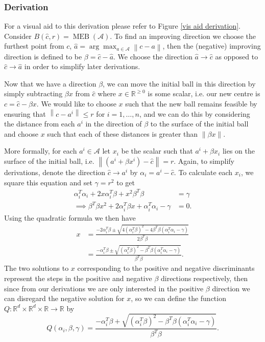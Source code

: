 \documentclass[11pt,twoside]{report}
\newcommand{\A}{\mathcal{A}} %
\newcommand{\norm}[1]{\left\lVert#1\right\rVert} %
\DeclareMathOperator{\MEB}{MEB}
\theoremstyle{definition}
\numberwithin{theorem}{section}
\numberwithin{definition}{section}
\numberwithin{lemma}{section}
\numberwithin{proposition}{section}
\numberwithin{equation}{section}
\numberwithin{figure}{section}
\begin{document}
\subsubsection{Derivation}
For a visual aid to this derivation please refer to Figure \ref{vis aid derivation}. Consider $B(\hat{c}, r) = \MEB(\A)$. To find an improving direction we choose the furthest point from $c$, $\hat{a}=\arg\max_{a\in\A}\norm{c-a}$, then the (negative) improving direction is defined to be $\beta=\hat{c}-\hat{a}$. We choose the direction $\hat{a}\to\hat{c}$ as opposed to $\hat{c}\to\hat{a}$ in order to simplify later derivations.

Now that we have a direction $\beta$, we can move the initial ball in this direction by simply subtracting $\beta x$ from $\hat{c}$ where $x\in\mathbb{R}^{\geq0}$ is some scalar, i.e. our new centre is $c=\hat{c}-\beta x$. We would like to choose $x$ such that the new ball remains feasible by ensuring that $\norm{c-a^i}\leq r$ for $i=1,\ldots,n$, and we can do this by considering the distance from each $a^i$ in the direction of $\beta$ to the surface of the initial ball and choose $x$ such that each of these distances is greater than $\norm{\beta x}$.

More formally, for each $a^i\in\A$ let $x_i$ be the scalar such that $a^i+\beta x_i$ lies on the surface of the initial ball, i.e. $\norm{(a^i+\beta x^i)-\hat{c}}=r$. Again, to simplify derivations, denote the direction $\hat{c}\to a^i$ by $\alpha_i=a^i-\hat{c}$. To calculate each $x_i$, we square this equation and set $\gamma=r^2$ to get
\begin{align*}
    \alpha_i^T\alpha_i + 2x\alpha_i^T\beta + x^2\beta^T\beta &= \gamma \\
    \implies \beta^T\beta x^2 + 2\alpha_i^T\beta x + \alpha_i^T\alpha_i - \gamma &= 0.
\end{align*}
Using the quadratic formula we then have
\begin{align*}
    x &= \frac{-2\alpha_i^T\beta \pm \sqrt{4\left(\alpha_i^T\beta\right)^2 - 4\beta^T \beta\left(\alpha_i^T\alpha_i-\gamma\right)}}{2\beta^T\beta} \\[4pt]
    &= \frac{-\alpha_i^T\beta \pm \sqrt{\left(\alpha_i^T\beta\right)^2 - \beta^T \beta\left(\alpha_i^T\alpha_i-\gamma\right)}}{\beta^T\beta}.
\end{align*}
The two solutions to $x$ corresponding to the positive and negative discriminants represent the steps in the positive and negative $\beta$ directions respectively, then since from our derivations we are only interested in the positive $\beta$ direction we can disregard the negative solution for $x$, so we can define the function $Q:\mathbb{R}^d\times\mathbb{R}^d\times\mathbb{R}\to\mathbb{R}$ by
\begin{equation*}
    Q(\alpha_i,\beta,\gamma) = \frac{-\alpha_i^T\beta + \sqrt{\left(\alpha_i^T\beta\right)^2 - \beta^T \beta\left(\alpha_i^T\alpha_i-\gamma\right)}}{\beta^T\beta}.
\end{equation*}
\end{document}

